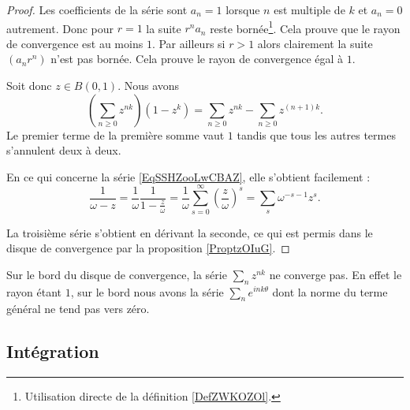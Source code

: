 \begin{proof}
    Les coefficients de la série sont \( a_n=1\) lorsque \( n\) est multiple de \( k\) et \( a_n=0\) autrement. Donc pour \( r=1\) la suite \( r^na_n\) reste bornée\footnote{Utilisation directe de la définition \ref{DefZWKOZOl}.}. Cela prouve que le rayon de convergence est au moins \( 1\). Par ailleurs si \( r>1\) alors clairement la suite \( (a_nr^n)\) n'est pas bornée. Cela prouve le rayon de convergence égal à \( 1\).

    Soit donc \( z\in B(0,1)\). Nous avons
    \begin{equation}
        \left( \sum_{n\geq 0}z^{nk} \right)(1-z^k)=\sum_{n\geq 0}z^{nk}-\sum_{n\geq 0}z^{(n+1)k}.
    \end{equation}
    Le premier terme de la première somme vaut \( 1\) tandis que tous les autres termes s'annulent deux à deux.

    En ce qui concerne la série \eqref{EqSSHZooLwCBAZ}, elle s'obtient facilement :
    \begin{equation}
        \frac{1}{ \omega-z }=\frac{1}{  \omega }\frac{1}{ 1-\frac{ z }{ \omega } }=\frac{1}{ \omega }\sum_{s=0}^{\infty}\left( \frac{ z }{ \omega } \right)^s=\sum_s\omega^{-s-1}z^s.
    \end{equation}
    
    La troisième série s'obtient en dérivant la seconde, ce qui est permis dans le disque de convergence par la proposition \ref{ProptzOIuG}.
\end{proof}

\begin{remark}
    Sur le bord du disque de convergence, la série \( \sum_nz^{nk}\) ne converge pas. En effet le rayon étant \( 1\), sur le bord nous avons la série \( \sum_n e^{ink\theta}\) dont la norme du terme général ne tend pas vers zéro.
\end{remark}

\subsection{Intégration}

